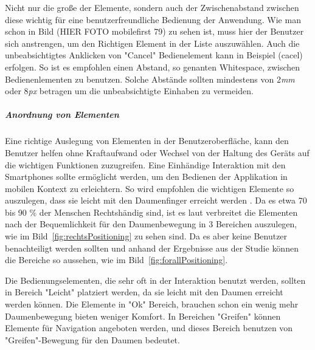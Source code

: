Nicht nur die große der Elemente, sondern auch der Zwischenabstand zwischen diese wichtig für eine benutzerfreundliche Bedienung der Anwendung. Wie man schon in Bild (HIER FOTO mobilefirst 79) zu sehen ist, muss hier der Benutzer sich anstrengen, um den Richtigen Element in der Liste auszuwählen. Auch die unbeabsichtigtes Anklicken von "Cancel" Bedienelement kann in Beispiel (cacel) erfolgen. So ist es empfohlen einen Abstand, so genanten Whitespace, zwischen Bedienenlementen zu benutzen. Solche Abstände sollten mindestens von 2\textit{mm} oder 8\textit{px} betragen\cite{lukeGUI} um die unbeabsichtigte Einhaben zu vermeiden.

\subparagraph{Anordnung von Elementen} 
\label{subp:anordnung_von_elementen}

Eine richtige Auslegung von Elementen in der Benutzeroberfläche, kann den Benutzer helfen ohne Kraftaufwand oder Wechsel von der Haltung des Geräts auf die wichtigen Funktionen zuzugreifen. Eine Einhändige Interaktion mit den Smartphones sollte ermöglicht werden, um den Bedienen der Applikation in mobilen Kontext zu erleichtern. So wird empfohlen die wichtigen Elemente so auszulegen, dass sie leicht mit den Daumenfinger erreicht werden \cite[Seite 209]{mobileFrontier}. Da es etwa 70 bis 90 $\%$ der Menschen Rechtshändig sind, ist es laut \cite[Seite 72]{mobileFirst} verbreitet die Elementen  nach der Bequemlichkeit für den Daumenbewegung in 3 Bereichen auszulegen, wie im Bild~\ref{fig:rechtsPositioning} zu sehen sind. Da es aber keine Benutzer benachteiligt werden sollten und anhand der Ergebnisse aus der Studie \cite{Park:2010tu} können die Bereiche so aussehen, wie im Bild~\ref{fig:forallPositioning}\cite[Seite 72]{mobileFirst}.

Die Bedienungselementen, die sehr oft in der Interaktion benutzt werden, sollten in Bereich "Leicht" platziert werden, da sie leicht mit den Daumen erreicht werden können. Die Elemente in "Ok" Bereich, brauchen schon ein wenig mehr Daumenbewegung bieten weniger Komfort. In Bereichen "Greifen" können Elemente für Navigation angeboten werden, und dieses Bereich benutzen von "Greifen"-Bewegung für den Daumen bedeutet.

